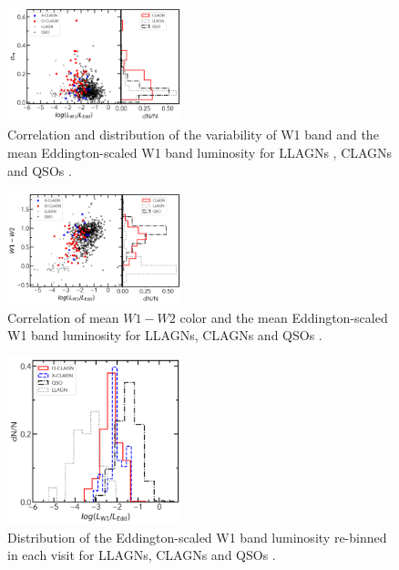 \documentclass[linenumbers]{aastex631}
\begin{document}
\begin{figure}
\centering
	\includegraphics[width=0.45\textwidth]{WISE_var_LW1_Ledd_hist.png}
    \caption{Correlation and distribution of the variability of W1 band and the mean  Eddington-scaled W1 band luminosity for LLAGNs \citep{2009MNRAS.399..349G}, CLAGNs and QSOs \citep{2007ApJ...667..131G}. }
    \label{fig:var_ledd_hist}
\end{figure}

\begin{figure}
\centering
	\includegraphics[width=0.45\textwidth]{pic/WISE_W1-W2_LW1_Ledd_hist.png}
    \caption{Correlation of mean $W1-W2$ color and the mean Eddington-scaled W1 band luminosity for LLAGNs\citep{2009MNRAS.399..349G}, CLAGNs and QSOs \citep{2007ApJ...667..131G}. }
    \label{fig:color_ledd}
\end{figure}

\begin{figure}
\centering
	\includegraphics[width=0.45\textwidth]{pic/WISE_LW1_Ledd_hist_rebin_OX.png}
    \caption{Distribution of the Eddington-scaled W1 band luminosity re-binned in each visit for LLAGNs\citep{2009MNRAS.399..349G}, CLAGNs and QSOs \citep{2007ApJ...667..131G}. }
    \label{fig:distribution_ledd}
\end{figure}
\end{document}
